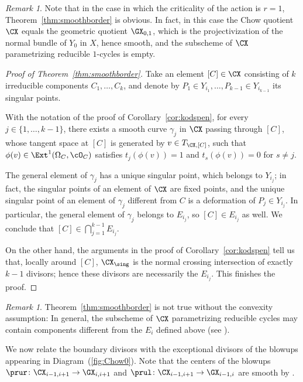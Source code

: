 \documentclass[11pt]{amsart}
\numberwithin{equation}{section}
\theoremstyle{definition}
\theoremstyle{remark}
\newtheorem{remark}[theorem]{Remark}
\begin{document}
\begin{remark}\label{rem:main1}
Note that in the case in which the criticality of the action is $r=1$, Theorem~\ref{thm:smoothborder} is obvious. In fact, in this case the Chow quotient $\CX$ equals the geometric quotient $\GX_{0,1}$, which is the projectivization of the normal bundle of $Y_0$ in $X$, hence smooth, and the subscheme of $\CX$ parametrizing reducible $1$-cycles is empty.
\end{remark}

\begin{proof}[Proof of Theorem~\ref{thm:smoothborder}]
Take an element $[C]\in \CX$ consisting of $k$ irreducible components $C_1,\dots,C_k$, and denote by $P_1\in Y_{i_1},\dots, P_{k-1}\in Y_{i_{k-1}}$ its singular points. 

With the notation of the proof of Corollary~\ref{cor:kodspen}, for every $j\in\{1,\dots,k-1\}$, there exists a smooth  curve $\gamma_j$ in $\CX$ passing through
 $[C]$, whose tangent space at $[C]$ is generated by $v\in T_{\CX,[C]}$, such that $\phi(v)\in \Ext^1(\Omega_C,\cO_C)$ satisfies $t_j(\phi(v))=1$ and $t_s(\phi(v))=0$ for $s\neq j$. 

The general element of $\gamma_j$ has a unique singular point, which belongs to $Y_{i_j}$; in fact, the singular points of an element of $\CX$ are fixed points, and the unique singular point of an element of $\gamma_j$ different from $C$ is a deformation of $P_j\in Y_{i_j}$. In particular, the general element of $\gamma_j$ belongs to  $E_{i_j}$, so $[C]\in E_{i_j}$ as well. We conclude that $[C]\in \bigcap_{j=1}^{k-1}E_{i_j}$.


On the other hand, the arguments in the proof of Corollary~\ref{cor:kodspen} tell us that, locally around $[C]$, $\CX_{\sing}$ is the normal crossing intersection of exactly $k-1$ divisors; hence these divisors are necessarily the $E_{i_j}$.  This finishes the proof.
\end{proof}

\begin{remark}\label{rem:smoothborder}
Theorem~\ref{thm:smoothborder} is not true without the convexity assumption: In general, the subscheme of $\CX$ parametrizing reducible cycles may contain components different from the $E_i$ defined above (see \cite[Example~6.1]{WORS6}). 
\end{remark}

We now relate the boundary divisors with the exceptional divisors of the blowups appearing in Diagram~(\ref{fig:Chow0}). Note that the centers of the blowups $\prur\colon\CX_{i-1,i+1}\to \GX_{i,i+1}$ and $\prul\colon\CX_{i-1,i+1}\to \GX_{i-1,i}$ are smooth by  \cite[Lemma~5.7]{WORS6}. 
\end{document}
